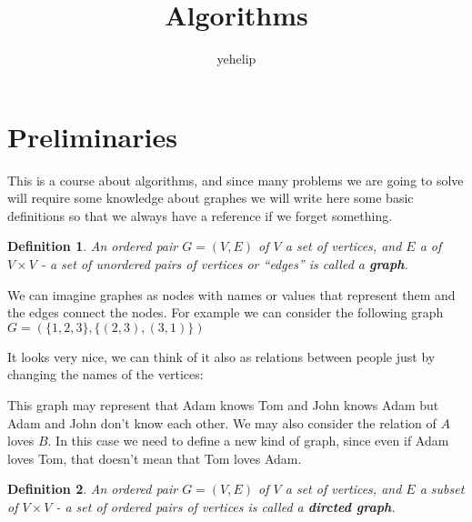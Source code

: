 \documentclass[11pt,a4paper]{article}
\title{\textbf{Algorithms}}
\author{yehelip}
\date{}
\theoremstyle{plain}
\newtheorem{definition}{Definition}[section]
\begin{document}
	\maketitle
	\newpage
	\section{Preliminaries}
	This is a course about algorithms, and since many problems we are going to
	solve will require some knowledge about graphes we will write here
	some basic definitions so that we always have a reference if we forget
	something.
	\begin{definition}
	An ordered pair $G=(V,E)$ of $V$ a set of vertices, and $E$ a 
	of $V \times V$ - a set of unordered pairs of vertices or ``edges'' is 
	called a \textbf{graph}.
	\end{definition}
	We can imagine graphes as nodes with names or values that represent them
	and the edges connect the nodes. For example we can consider the following
	graph $G=(\{1,2,3\}, \{(2,3),(3,1)\})$
	\begin{center}\end{center}
	It looks very nice, we can think of it also as relations between people
	just by changing the names of the vertices:
	\begin{center}\end{center}
	This graph may represent that Adam knows Tom and John knows Adam but
	Adam and John don't know each other. We may also consider the relation
	of $A$ loves $B$. In this case we need to define a new kind of graph,
	since even if Adam loves Tom, that doesn't mean that Tom loves Adam.
	\begin{definition}
	An ordered pair $G=(V,E)$ of $V$ a set of vertices, and $E$ a subset
	of $V \times V$ - a set of ordered pairs of vertices is
	called a \textbf{dircted graph}.
	\end{definition}
\end{document}
